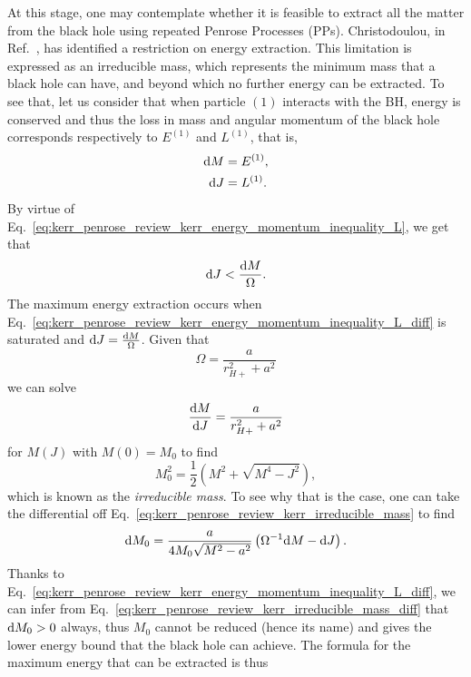 At this stage, one may contemplate whether it is feasible to extract all the matter from the black hole using repeated Penrose Processes (PPs). Christodoulou, in Ref.~\cite{CHRISTODOULOU1970}, has identified a restriction on energy extraction. This limitation is expressed as an irreducible mass, which represents the minimum mass that a black hole can have, and beyond which no further energy can be extracted. To see that, let us consider that when particle $(1)$ interacts with the BH, energy is conserved and thus the loss in mass and angular momentum of the black hole corresponds respectively to $E^{(1)}$ and $L^{(1)}$, that is,
%
\begin{align}
  \mathrm{d} M & = E^{(1)} \label{eq:kerr_penrose_review_kerr_mass_change}, \\
  \mathrm{d} J & = L^{(1)} \label{eq:kerr_penrose_review_kerr_L_change}.
\end{align}
%
By virtue of Eq.~\eqref{eq:kerr_penrose_review_kerr_energy_momentum_inequality_L}, we get that
%
\begin{equation}
  \mathrm{d} J < \frac{\mathrm{d} M}{\Omega}.
  \label{eq:kerr_penrose_review_kerr_energy_momentum_inequality_L_diff}
\end{equation}
%
The maximum energy extraction occurs when Eq.~\eqref{eq:kerr_penrose_review_kerr_energy_momentum_inequality_L_diff} is saturated and $\mathrm{d} J = \frac{\mathrm{d} M}{\Omega}$. Given that
%
\begin{equation}
  \Omega = \frac{a}{r_{H+}^2 + a^2}
  \label{eq:kerr_penrose_review_kerr_angular_momentum_def}
\end{equation}
%
we can solve
%
\begin{equation}
  \frac{\mathrm{d} M}{\mathrm{d} J} = \frac{a}{r_{H+}^2 + a^2}
  \label{eq:kerr_penrose_review_kerr_mass_ODE}
\end{equation}
%
for $M(J)$ with $M(0) = M_0$ to find
%
\begin{equation}
  M_0^2 = \frac{1}{2}\left( M^2 + \sqrt{M^4 - J^2} \right),
  \label{eq:kerr_penrose_review_kerr_irreducible_mass}
\end{equation}
%
which is known as the \emph{irreducible mass}. To see why that is the case, one can take the differential off Eq.~\eqref{eq:kerr_penrose_review_kerr_irreducible_mass} to find
%
\begin{equation}
  \mathrm{d} M_0 = \frac{a}{4 M_0 \sqrt{M^2 - a^2}}\left( \Omega^{-1} \mathrm{d} M - \mathrm{d} J \right).
  \label{eq:kerr_penrose_review_kerr_irreducible_mass_diff}
\end{equation}
%
Thanks to Eq.~\eqref{eq:kerr_penrose_review_kerr_energy_momentum_inequality_L_diff}, we can infer from Eq.~\eqref{eq:kerr_penrose_review_kerr_irreducible_mass_diff} that $\mathrm{d} M_0 > 0$ always, thus $M_0$ cannot be reduced (hence its name) and gives the lower energy bound that the black hole can achieve. The formula for the maximum energy that can be extracted is thus
